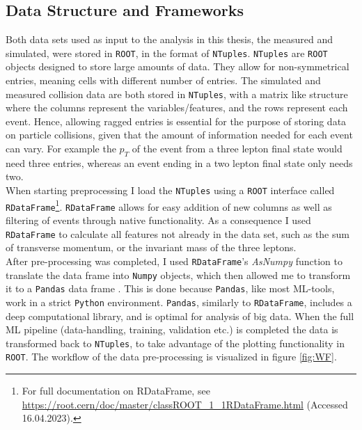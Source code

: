 \subsection{Data Structure and Frameworks}
Both data sets used as input to the analysis in this thesis, the measured and simulated, were stored in \verb!ROOT!, in the format of \verb!NTuples!. 
\verb!NTuples! are \verb!ROOT! objects designed to store large amounts of data. They allow for non-symmetrical entries, meaning 
cells with different number of entries. The simulated and measured collision data are both stored in \verb!NTuples!, with a matrix like structure 
where the columns represent the variables/features, and the rows represent each event. Hence, allowing ragged entries is essential 
for the purpose of storing data on particle collisions, given that the amount of information needed for each event can vary. For example the $p_T$ of the 
event from a three lepton final state would need three entries, whereas an event ending in a two lepton final state only needs two.
\\
When starting preprocessing I load the \verb!NTuples! using a \verb!ROOT! interface called \verb!RDataFrame!\footnote{For full 
documentation on RDataFrame, see \url{https://root.cern/doc/master/classROOT\_1\_1RDataFrame.html} 
(Accessed 16.04.2023).}. \verb!RDataFrame! allows for easy addition of new columns as well as filtering of events through native functionality. 
As a consequence I used \verb!RDataFrame! to calculate all features not already in the data set, such as the sum of transverse momentum, 
or the invariant mass of the three leptons. 
\\
After pre-processing was completed, I used \verb!RDataFrame!'s \emph{AsNumpy} function to translate the data frame into 
\verb!Numpy! objects, which then allowed me to transform it to a \verb!Pandas! data frame \cite{Pandas}. This is done
because \verb!Pandas!, like most \ac{ML}-tools, work in a strict \verb!Python! environment. \verb!Pandas!, similarly to \verb!RDataFrame!,
includes a deep computational library, and is optimal for analysis of big data. When the full \ac{ML} 
pipeline (data-handling, training, validation etc.) is completed the data is transformed back to \verb!NTuples!, 
to take advantage of the plotting functionality in \verb!ROOT!. The workflow of the data pre-processing is visualized in figure 
\ref{fig:WF}.
